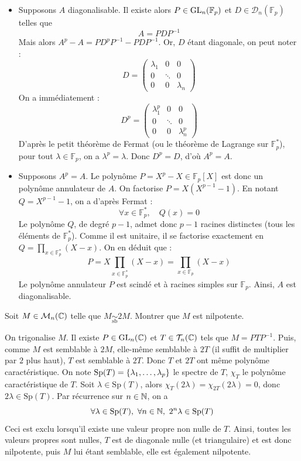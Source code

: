 \begin{solution}
\begin{itemize}
\item[$\boxed{\Rightarrow}$] Supposons $A$ diagonalisable. Il existe alors $P\in \operatorname{GL}_n(\mathbb F_p)$ et $D\in \mathcal D_n(\mathbb F_p)$ telles que
\[A=PDP^{-1}\]
Mais alors $A^p-A = PD^pP^{-1} - PDP^{-1}$. Or, $D$ étant diagonale, on peut noter : 
\[ D = \begin{pmatrix} \lambda_1 & 0 & 0 \\ 0 & \ddots & 0 \\ 0 & 0 & \lambda_n \end{pmatrix} \]
On a immédiatement :
\[ D^p = \begin{pmatrix} \lambda_1^p & 0 & 0 \\ 0 & \ddots & 0 \\ 0 & 0 & \lambda_n^p \end{pmatrix} \]
D'après le petit théorème de Fermat (ou le théorème de Lagrange sur $\mathbb F_p^*$), pour tout $\lambda\in\mathbb F_p$, on a $\lambda^p=\lambda$. Donc $D^p=D$, d'où $A^p=A$.
\item[$\boxed{\Leftarrow}$] Supposons $A^p=A$. Le polynôme $P = X^p-X \in \mathbb F_p[X]$ est donc un polynôme annulateur de $A$. 
On factorise $P = X(X^{p-1}-1)$. En notant $Q = X^{p-1}-1$, on a d'après Fermat :
\[\forall x\in\mathbb F_p^*,\quad Q(x)=0\]
Le polynôme $Q$, de degré $p-1$, admet donc $p-1$ racines distinctes (tous les éléments de $\mathbb F_p^*$). Comme il est unitaire, il se factorise exactement en $Q = \prod_{x\in\mathbb F_p^*}(X-x)$.
On en déduit que :
\[P = X \prod_{x\in\mathbb F_p^*}(X-x) = \prod_{x\in\mathbb F_p}(X-x)\]
Le polynôme annulateur $P$ est scindé et à racines simples sur $\mathbb F_p$. Ainsi, $A$ est diagonalisable.
\end{itemize}
\end{solution}

\begin{exo}
	\label{reduction4}
	Soit $M\in\mathcal M_n(\operatorname{\mathbb C})$ telle que $M\underset{\text{sb}}{\sim}2M$. Montrer que $M$ est nilpotente.
\end{exo}

\begin{solution}
	On trigonalise $M$. Il existe $P\in \operatorname{GL}_n(\operatorname{\mathbb C})$ et $T\in \mathcal T_n(\operatorname{\mathbb C})$ tels que $M=PTP^{-1}$. 
    Puis, comme $M$ est semblable à $2M$, elle-même semblable à $2T$ (il suffit de multiplier par $2$ plus haut), $T$ est semblable à $2T$. 
    Donc $T$ et $2T$ ont même polynôme caractéristique. On note $\operatorname{Sp}(T)=\lbrace \lambda_1,\dots,\lambda_p\rbrace$ le spectre de $T$, $\chi_T$ 
    le polynôme caractéristique de $T$. Soit $\lambda\in \text{Sp}(T)$, alors $\chi_T(2\lambda)=\chi_{2T}(2\lambda)=0$, donc $2\lambda \in \text{Sp}(T)$. 
    Par récurrence sur $n\in\operatorname{\mathbb N}$, on a \[\forall \lambda \in \text{Sp}(T),\ \forall n\in\operatorname{\mathbb N},\ 2^n\lambda\in\text{Sp}(T)\]
	Ceci est exclu lorsqu'il existe une valeur propre non nulle de $T$. 
    Ainsi, toutes les valeurs propres sont nulles, $T$ est de diagonale nulle (et triangulaire) et est donc nilpotente, puis $M$ lui étant semblable, 
    elle est également nilpotente.
\end{solution}

